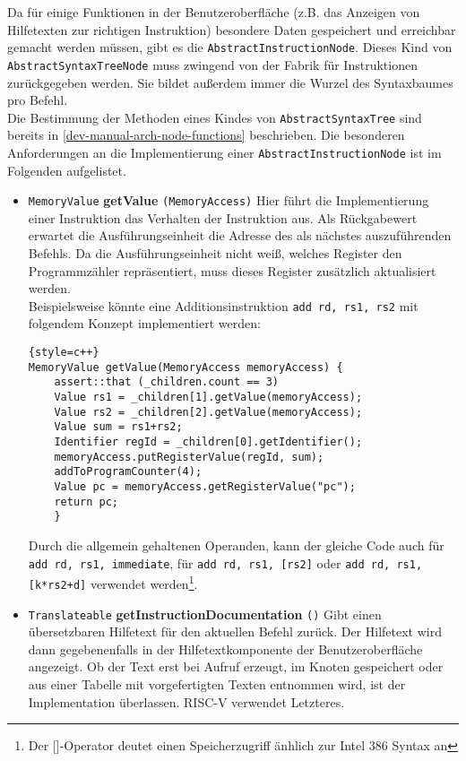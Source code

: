 Da für einige Funktionen in der Benutzeroberfläche (z.B. das Anzeigen von
Hilfetexten zur richtigen Instruktion) besondere Daten gespeichert und
erreichbar gemacht werden müssen, gibt es die \texttt{AbstractInstructionNode}.
Dieses Kind von \texttt{AbstractSyntaxTreeNode} muss zwingend von der Fabrik für
Instruktionen zurückgegeben werden. Sie bildet außerdem immer die Wurzel des
Syntaxbaumes pro Befehl.\\
Die Bestimmung der Methoden eines Kindes von \texttt{AbstractSyntaxTree} sind bereits in \autoref{dev-manual-arch-node-functions} beschrieben. Die besonderen Anforderungen an die Implementierung einer \texttt{AbstractInstructionNode} ist im Folgenden aufgelistet.

\begin{itemize}

  \item \texttt{MemoryValue} \textbf{getValue} \texttt{(MemoryAccess)} Hier
  führt die Implementierung einer Instruktion das Verhalten der Instruktion aus.
  Als Rückgabewert erwartet die Ausführungseinheit die Adresse des als nächstes
  auszuführenden Befehls. Da die Ausführungseinheit nicht weiß, welches Register
  den Programmzähler repräsentiert, muss dieses Register zusätzlich aktualisiert
  werden. \\ Beispielsweise könnte eine Additionsinstruktion
  \texttt{add rd, rs1, rs2} mit folgendem Konzept implementiert werden:

\begin{lstlisting}{style=c++}
MemoryValue getValue(MemoryAccess memoryAccess) {
	assert::that (_children.count == 3)
	Value rs1 = _children[1].getValue(memoryAccess);
	Value rs2 = _children[2].getValue(memoryAccess);
	Value sum = rs1+rs2;
	Identifier regId = _children[0].getIdentifier();
	memoryAccess.putRegisterValue(regId, sum);
	addToProgramCounter(4);
	Value pc = memoryAccess.getRegisterValue("pc");
	return pc;
	}
\end{lstlisting}

	Durch die allgemein gehaltenen Operanden, kann der gleiche Code auch für
	\texttt{add rd, rs1, immediate}, für \texttt{add rd, rs1, [rs2]} oder
	\texttt{add rd, rs1, [k*rs2+d]} verwendet werden\footnote{Der []-Operator
	deutet einen Speicherzugriff änhlich zur Intel 386 Syntax an}.

  \item \texttt{Translateable} \textbf{getInstructionDocumentation} \texttt{()}
  Gibt einen übersetzbaren Hilfetext für den aktuellen Befehl zurück. Der
  Hilfetext wird dann gegebenenfalls in der Hilfetextkomponente der
  Benutzeroberfläche angezeigt. Ob der Text erst bei Aufruf erzeugt, im Knoten
  gespeichert oder aus einer Tabelle mit vorgefertigten Texten entnommen wird,
  ist der Implementation überlassen. RISC-V verwendet Letzteres.

\end{itemize}


